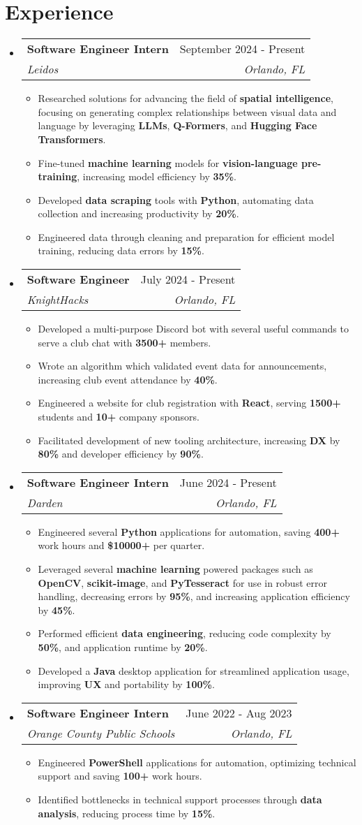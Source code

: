 \documentclass[letterpaper,11pt]{article}
\makeatletter
\newcommand{\resumeItem}[1]{
  \item\small{
    {#1 \vspace{-2pt}}
  }
}
\newcommand{\resumeSubheading}[4]{
  \vspace{-2pt}\item
    \begin{tabular*}{0.97\textwidth}[t]{l@{\extracolsep{\fill}}r}
      \textbf{#1} & #2 \\
      \textit{\small#3} & \textit{\small #4} \\
    \end{tabular*}\vspace{-7pt}
}
\newcommand{\resumeSubHeadingListStart}{\begin{itemize}[leftmargin=0.15in, label={}]}
\newcommand{\resumeSubHeadingListEnd}{\end{itemize}}
\newcommand{\resumeItemListStart}{\begin{itemize}}
\newcommand{\resumeItemListEnd}{\end{itemize}\vspace{-5pt}}
\makeatother
\begin{document}
\section{Experience}
  \resumeSubHeadingListStart
      \resumeSubheading
      {Software Engineer Intern}{September 2024 - Present}
      {Leidos}{Orlando, FL}
      \resumeItemListStart
        \resumeItem{Researched solutions for advancing the field of \textbf{spatial intelligence}, focusing on generating complex relationships between visual data and language by leveraging \textbf{LLMs}, \textbf{Q-Formers}, and \textbf{Hugging Face Transformers}.}
        \resumeItem{Fine-tuned \textbf{machine learning} models for \textbf{vision-language pre-training}, increasing model efficiency by \textbf{35\%}.}
        \resumeItem{Developed \textbf{data scraping} tools with \textbf{Python}, automating data collection and increasing productivity by \textbf{20\%}.}
        \resumeItem{Engineered data through cleaning and preparation for efficient model training, reducing data errors by \textbf{15\%}. }
    \resumeItemListEnd
    \resumeSubheading
      {Software Engineer}{July 2024 - Present}
      {KnightHacks}{Orlando, FL}
      \resumeItemListStart
        \resumeItem{Developed a multi-purpose Discord bot with several useful commands to serve a club chat with \textbf{3500+} members.}
        \resumeItem{Wrote an algorithm which validated event data for announcements, increasing club event attendance by \textbf{40\%}.}
        \resumeItem{Engineered a website for club registration with \textbf{React}, serving \textbf{1500+} students and \textbf{10+} company sponsors.}
        \resumeItem{Facilitated development of new tooling architecture, increasing \textbf{DX} by \textbf{80\%} and developer efficiency by \textbf{90\%}.}
    \resumeItemListEnd
    \resumeSubheading
      {Software Engineer Intern}{June 2024 - Present}
      {Darden}{Orlando, FL}
      \resumeItemListStart
        \resumeItem{Engineered several \textbf{Python} applications for automation, saving \textbf{400+} work hours and \textbf{\$10000+} per quarter.}
        \resumeItem{Leveraged several \textbf{machine learning} powered packages such as \textbf{OpenCV}, \textbf{scikit-image}, and \textbf{PyTesseract} for use in robust error handling, decreasing errors by \textbf{95\%}, and increasing application efficiency by \textbf{45\%}.}
        \resumeItem{Performed efficient \textbf{data engineering}, reducing code complexity by \textbf{50\%}, and application runtime by \textbf{20\%}.}
        \resumeItem{Developed a \textbf{Java} desktop application for streamlined application usage, improving \textbf{UX} and portability by \textbf{100\%}.}
    \resumeItemListEnd
    \resumeSubheading
      {Software Engineer Intern}{June 2022 - Aug 2023}
      {Orange County Public Schools}{Orlando, FL}
      \resumeItemListStart
        \resumeItem{Engineered \textbf{PowerShell} applications for automation, optimizing technical support and saving \textbf{100+} work hours.}
        \resumeItem{Identified bottlenecks in technical support processes through \textbf{data analysis}, reducing process time by \textbf{15\%}.}
    \resumeItemListEnd
    \resumeSubHeadingListEnd
\end{document}
